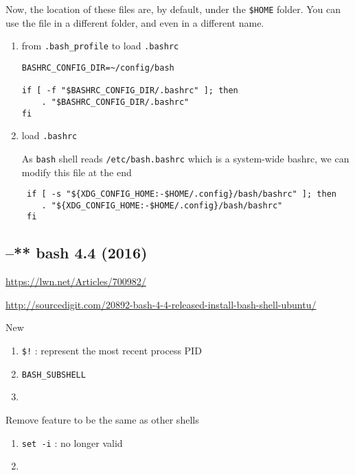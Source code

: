 Now, the location of these files are, by default, under the \verb!$HOME! folder. 
You can use the file in a different folder, and even in a different name.
\begin{enumerate}
  \item from \verb!.bash_profile! to load \verb!.bashrc!
  
\begin{verbatim}
BASHRC_CONFIG_DIR=~/config/bash

if [ -f "$BASHRC_CONFIG_DIR/.bashrc" ]; then
    . "$BASHRC_CONFIG_DIR/.bashrc"
fi
\end{verbatim}


  \item load \verb!.bashrc! 
  
  As \verb!bash! shell reads \verb!/etc/bash.bashrc! which is a system-wide
  bashrc, we can modify this file at the end

\begin{verbatim}
 if [ -s "${XDG_CONFIG_HOME:-$HOME/.config}/bash/bashrc" ]; then
    . "${XDG_CONFIG_HOME:-$HOME/.config}/bash/bashrc"
 fi
\end{verbatim}

\end{enumerate}

\subsection{--** bash 4.4 (2016)}
\label{sec:bash-4.4}

\url{https://lwn.net/Articles/700982/}

\url{http://sourcedigit.com/20892-bash-4-4-released-install-bash-shell-ubuntu/}

New 
\begin{enumerate}
  \item \verb.$!.  : represent the most recent process  PID
  
  
  \item \verb!BASH_SUBSHELL!
  
  
  \item 
\end{enumerate}

Remove feature to be the same as other shells
\begin{enumerate}
  \item \verb!set -i! 	: no longer valid
  
  
  \item 
\end{enumerate}


